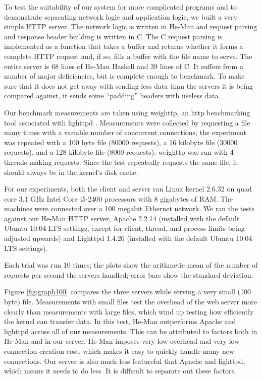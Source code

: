 \documentclass[preprint]{sigplanconf}
\begin{document}
To test the suitability of our system for more complicated programs
and to demonstrate separating network logic and application logic, we
built a very simple HTTP server. The network logic is written in
He-Man and request parsing and response header building is written in
C. The C request parsing is implemented as a function that takes a
buffer and returns whether it forms a complete HTTP request and, if
so, fills a buffer with the file name to serve. The entire server is
68 lines of He-Man Haskell and 39 lines of C. It suffers from a number
of major deficiencies, but is complete enough to benchmark. To make
sure that it does not get away with sending less data than the servers
it is being compared against, it sends some ``padding'' headers with
useless data.

Our benchmark measurements are taken using weighttp, an http
benchmarking tool associated with lighttpd
\cite{weighttp}. Measurements were collected by requesting a file many
times with a variable number of concurrent connections; the experiment
was repeated with a 100 byte file (80000 requests), a 16 kilobyte file
(30000 requests), and a 128 kilobyte file (8000 requests).
weighttp was run with 4 threads making requests.
Since the test repeatedly requests the same file, it should always be in
the kernel's disk cache.

For our experiments, both the client and server ran Linux kernel
2.6.32 on quad core 3.1 GHz Intel Core i5-2400 processors with 8
gigabytes of RAM. The machines were connected over a 100 megabit
Ethernet network.
We ran the tests against our He-Man HTTP server, Apache 2.2.14 (installed
with the default Ubuntu 10.04 LTS settings, except for client, thread,
and process limits being adjusted upwards) and Lighttpd 1.4.26
(installed with the default Ubuntu 10.04 LTS settings).

Each trial was run 10 times; the plots show the arithmetic mean of the
number of requests per second the servers handled; error bars show the
standard deviation.

Figure \ref{fig:graph100} compares the three servers while serving a
very small (100 byte) file. Measurements with small files test the
overhead of the web server more clearly than measurements with large
files, which wind up testing how efficiently the kernel can transfer
data. In this test, He-Man outperforms Apache and lighttpd across all
of our measurements. This can be attributed to factors both in He-Man
and in our server. He-Man imposes very low overhead and very low
connection creation cost, which makes it easy to quickly handle many
new connections. Our server is also much less featureful that Apache
and lighttpd, which means it needs to do less. It is difficult to
separate out these factors.
\end{document}
